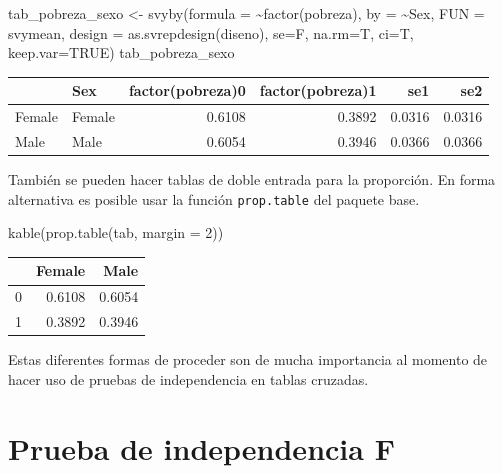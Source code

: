 \documentclass[
  12pt,
]{book}
\newenvironment{Shaded}{\begin{snugshade}}{\end{snugshade}}
\newcommand{\AttributeTok}[1]{\textcolor[rgb]{0.77,0.63,0.00}{#1}}
\newcommand{\ConstantTok}[1]{\textcolor[rgb]{0.00,0.00,0.00}{#1}}
\newcommand{\DecValTok}[1]{\textcolor[rgb]{0.00,0.00,0.81}{#1}}
\newcommand{\FunctionTok}[1]{\textcolor[rgb]{0.00,0.00,0.00}{#1}}
\newcommand{\NormalTok}[1]{#1}
\newcommand{\OtherTok}[1]{\textcolor[rgb]{0.56,0.35,0.01}{#1}}
\newcommand{\SpecialCharTok}[1]{\textcolor[rgb]{0.00,0.00,0.00}{#1}}
\begin{document}
\begin{Shaded}
\begin{Highlighting}[]
\NormalTok{tab\_pobreza\_sexo }\OtherTok{\textless{}{-}} \FunctionTok{svyby}\NormalTok{(}\AttributeTok{formula =} \SpecialCharTok{\textasciitilde{}}\FunctionTok{factor}\NormalTok{(pobreza), }
                          \AttributeTok{by =} \SpecialCharTok{\textasciitilde{}}\NormalTok{Sex,}
                          \AttributeTok{FUN =}\NormalTok{ svymean, }
                          \AttributeTok{design =} \FunctionTok{as.svrepdesign}\NormalTok{(diseno), }
                          \AttributeTok{se=}\NormalTok{F, }\AttributeTok{na.rm=}\NormalTok{T, }\AttributeTok{ci=}\NormalTok{T, }\AttributeTok{keep.var=}\ConstantTok{TRUE}\NormalTok{)}
\NormalTok{tab\_pobreza\_sexo}
\end{Highlighting}
\end{Shaded}

\begin{tabular}{l|l|r|r|r|r}
\hline
  & Sex & factor(pobreza)0 & factor(pobreza)1 & se1 & se2\\
\hline
Female & Female & 0.6108 & 0.3892 & 0.0316 & 0.0316\\
\hline
Male & Male & 0.6054 & 0.3946 & 0.0366 & 0.0366\\
\hline
\end{tabular}

También se pueden hacer tablas de doble entrada para la proporción.
En forma alternativa es posible usar la función \texttt{prop.table} del paquete base.

\begin{Shaded}
\begin{Highlighting}[]
\FunctionTok{kable}\NormalTok{(}\FunctionTok{prop.table}\NormalTok{(tab, }\AttributeTok{margin =} \DecValTok{2}\NormalTok{))}
\end{Highlighting}
\end{Shaded}

\begin{tabular}{l|r|r}
\hline
  & Female & Male\\
\hline
0 & 0.6108 & 0.6054\\
\hline
1 & 0.3892 & 0.3946\\
\hline
\end{tabular}

Estas diferentes formas de proceder son de mucha importancia al momento de hacer uso de pruebas de independencia en tablas cruzadas.

\hypertarget{prueba-de-independencia-f}{%
\section{Prueba de independencia F}\label{prueba-de-independencia-f}}
\end{document}
